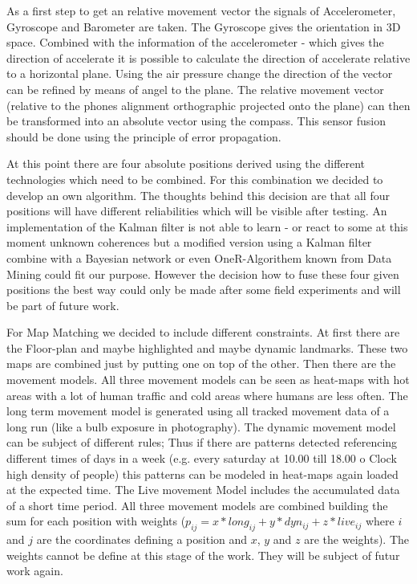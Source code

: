 As a first step to get an relative movement vector the signals of Accelerometer, Gyroscope and Barometer are taken. The Gyroscope gives the orientation in 3D space. Combined with the information of the accelerometer - which gives the direction of accelerate it is possible to calculate the direction of accelerate relative to a horizontal plane. Using the air pressure change the direction of the vector can be refined by means of angel to the plane. The relative movement vector (relative to the phones alignment orthographic projected onto the plane) can then be transformed into an absolute vector using the compass. This sensor fusion should be done using the principle of error propagation. 

At this point there are four absolute positions derived using the different technologies which need to be combined. For this combination we decided to develop an own algorithm. The thoughts behind this decision are that all four positions will have different reliabilities which will be visible after testing. An implementation of the Kalman filter is not able to learn - or react to some at this moment unknown coherences but a modified version using a Kalman filter combine with a Bayesian network or even OneR-Algorithem known from Data Mining could fit our purpose. However the decision how to fuse these four given positions the best way could only be made after some field experiments and will be part of future work.

For Map Matching we decided to include different constraints. At first there are the Floor-plan and maybe highlighted and maybe dynamic landmarks. These two maps are combined just by putting one on top of the other. Then there are the movement models. All three movement models can be seen as heat-maps with hot areas with a lot of human traffic and cold areas where humans are less often. The long term movement model is generated using all tracked movement data of a long run (like a bulb exposure in photography). The dynamic movement model can be subject of different rules; Thus if there are patterns detected referencing different times of days in a week (e.g. every saturday at 10.00 till 18.00 o Clock high density of people) this patterns can be modeled in heat-maps again loaded at the expected time. The Live movement Model includes the accumulated data of a short time period. All three movement models are combined building the sum for each position with weights ($p_{ij}=x*long_{ij}+y*dyn_{ij}+z*live_{ij}$ where $i$ and $j$ are the coordinates defining a position and $x$, $y$ and $z$ are the weights). 
The weights cannot be define at this stage of the work. They will be subject of futur work again.

